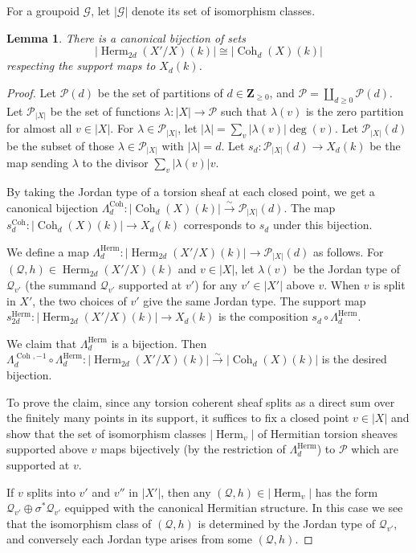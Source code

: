 \documentclass[reqno]{amsart}
\numberwithin{equation}{section}
\newcommand{\Z}{\mathbf{Z}}
\DeclareMathOperator{\Herm}{Herm}
\DeclareMathOperator{\Coh}{Coh}
\newcommand{\SH}{\textup{SkHm}}
\newcommand{\isom}{\stackrel{\sim}{\to}}
\newcommand\op{\oplus}
\renewcommand\c{\circ}
\newcommand{\s}{\sigma}
\renewcommand{\l}{\lambda}
\renewcommand{\L}{\Lambda}
\newcommand\cG{\mathcal{G}}
\newcommand\cP{\mathcal{P}}
\newcommand\cQ{\mathcal{Q}}
\newtheorem{lemma}[thm]{Lemma}
\theoremstyle{remark}
\numberwithin{equation}{section}
\begin{document}
For a groupoid $\cG$, let $|\cG|$ denote its set of isomorphism classes.
\begin{lemma}\label{l:bij}
There is a canonical bijection of sets
\begin{equation*}
|\Herm_{2d}(X'/X)(k)|\cong |\Coh_{d}(X)(k)|
\end{equation*}
respecting the support maps to $X_{d}(k)$. %
\end{lemma}
\begin{proof} Let $\cP(d)$ be the set of partitions of $d\in\Z_{\ge0}$, and $\cP=\coprod_{d\ge0}\cP(d)$. Let $\cP_{|X|}$ be the set of functions $\l: |X|\to \cP$ such that $\l(v)$ is the zero partition for almost all $v\in |X|$. For $\l\in \cP_{|X|}$, let $|\l|=\sum_{v}|\l(v)|\deg(v)$. Let $\cP_{|X|}(d)$ be the subset of those $\l\in \cP_{|X|}$ with $|\l|=d$. Let $s_{d}: \cP_{|X|}(d)\to X_{d}(k)$ be the map sending  $\l$ to the divisor $\sum_{v}|\l(v)|v$. 

By taking the Jordan type of a torsion sheaf at each closed point, we get a canonical bijection $\L^{\Coh}_{d}: |\Coh_{d}(X)(k)|\isom\cP_{|X|}(d)$. The map $s_{d}^{\Coh}:|\Coh_d(X)(k)|\to X_{d}(k)$ corresponds to $s_{d}$ under this bijection.

We define a map $\L^{\Herm}_{d}: |\Herm_{2d}(X'/X)(k)|\to \cP_{|X|}(d)$ as follows. For $(\cQ,h)\in \Herm_{2d}(X'/X)(k)$ and $v\in |X|$,  let $\l(v)$ be the Jordan type of $\cQ_{v'}$ (the summand $\cQ_{v'}$ supported at $v'$) for any $v'\in |X'|$ above $v$. When $v$ is split in $X'$, the two choices of $v'$ give the same Jordan type. The support map $s_{2d}^{\Herm}: |\Herm_{2d}(X'/X)(k)|\to X_{d}(k)$ is the composition $s_{d}\c \L^{\Herm}_{d}$. 

We claim that $\L^{\Herm}_{d}$ is a bijection. Then $\L^{\Coh,-1}_{d}\c\L^{\Herm}_{d}: |\Herm_{2d}(X'/X)(k)|\isom |\Coh_{d}(X)(k)|$ is the desired bijection. 

To prove the claim, since any torsion coherent sheaf splits as a direct sum over the finitely many points in its support, it suffices to fix a closed point $v\in |X|$ and show that the set of isomorphism classes $|\Herm_{v}|$ of Hermitian torsion sheaves supported above $v$ maps bijectively (by the restriction of $\L^{\Herm}_{d}$) to $\cP$ which are supported at $v$. 

If $v$ splits into $v'$ and $v''$ in $|X'|$, then any $(\cQ,h)\in |\Herm_{v}|$ has the form $\cQ_{v'}\op \s^{*}\cQ_{v'}$ equipped with the canonical Hermitian structure. In this case we see that the isomorphism class of $(\cQ,h)$ is determined by the Jordan type of $\cQ_{v'}$, and conversely each Jordan type arises from some $(\cQ, h)$. 


\end{proof}
\end{document}
